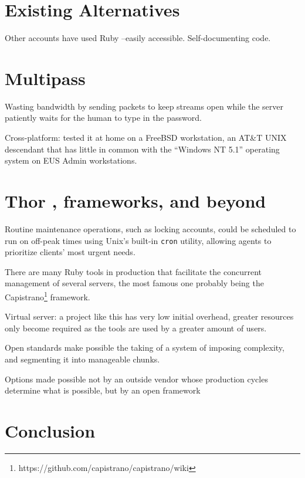 \documentclass[12pt]{article}
\begin{document}
\section{Existing Alternatives}

Other accounts have used 
Ruby --easily accessible.  Self-documenting code.



\section{Multipass}

Wasting bandwidth by sending packets to keep streams open while the
server patiently waits for the human to type in the password.   


Cross-platform:  tested it at home on a FreeBSD workstation, an  AT\&T
UNIX descendant that has little in common with the ``Windows NT 5.1''
operating system on EUS Admin workstations.


\section{Thor , frameworks, and beyond}

Routine maintenance operations, such as locking accounts, could be
scheduled to run on off-peak times using Unix's built-in \texttt{cron}
utility, allowing agents to prioritize clients' most urgent needs. 


There are many Ruby tools in production that facilitate the concurrent
management of several servers, the most famous one probably being the
Capistrano\footnote{https://github.com/capistrano/capistrano/wiki} framework.

Virtual server: a project like this has very low initial overhead,
greater resources only become required as the tools are used by a
greater amount of users.  


Open standards make possible the taking of a system of imposing
complexity, and segmenting it into manageable chunks.



Options made possible not by an outside vendor whose production cycles
determine what is possible, but by an open framework 


\section{Conclusion}
\end{document}
